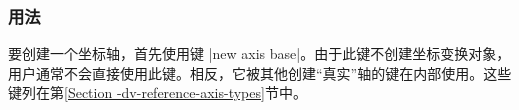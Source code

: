 \subsubsection{用法}


要创建一个坐标轴，首先使用键 |new axis base|。由于此键不创建坐标变换对象，用户通常不会直接使用此键。相反，它被其他创建``真实''轴的键在内部使用。这些键列在第\ref{Section -dv-reference-axis-types}节中。

